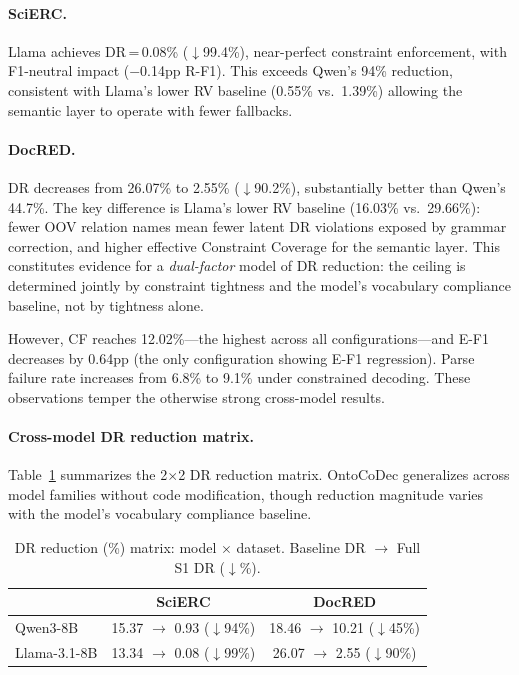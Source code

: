 \documentclass[11pt,a4paper]{article}
\newcommand{\sys}{OntoCoDec\xspace}
\begin{document}
\paragraph{SciERC.}
Llama achieves DR\,=\,0.08\% ($\downarrow$99.4\%), near-perfect constraint enforcement, with F1-neutral impact ($-$0.14pp R-F1).
This exceeds Qwen's 94\% reduction, consistent with Llama's lower RV baseline (0.55\% vs.\ 1.39\%) allowing the semantic layer to operate with fewer fallbacks.

\paragraph{DocRED.}
DR decreases from 26.07\% to 2.55\% ($\downarrow$90.2\%), substantially better than Qwen's 44.7\%.
The key difference is Llama's lower RV baseline (16.03\% vs.\ 29.66\%): fewer OOV relation names mean fewer latent DR violations exposed by grammar correction, and higher effective Constraint Coverage for the semantic layer.
This constitutes evidence for a \emph{dual-factor} model of DR reduction: the ceiling is determined jointly by constraint tightness and the model's vocabulary compliance baseline, not by tightness alone.

However, CF reaches 12.02\%---the highest across all configurations---and E-F1 decreases by 0.64pp (the only configuration showing E-F1 regression).
Parse failure rate increases from 6.8\% to 9.1\% under constrained decoding.
These observations temper the otherwise strong cross-model results.

\paragraph{Cross-model DR reduction matrix.}
Table~\ref{tab:dr_matrix} summarizes the 2$\times$2 DR reduction matrix.
\sys generalizes across model families without code modification, though reduction magnitude varies with the model's vocabulary compliance baseline.

\begin{table}[t]
\centering
\caption{DR reduction (\%) matrix: model $\times$ dataset. Baseline DR $\to$ Full S1 DR ($\downarrow$\%).}
\label{tab:dr_matrix}
\small
\begin{tabular}{lcc}
\toprule
 & \textbf{SciERC} & \textbf{DocRED} \\
\midrule
Qwen3-8B     & 15.37 $\to$ 0.93 ($\downarrow$94\%) & 18.46 $\to$ 10.21 ($\downarrow$45\%) \\
Llama-3.1-8B & 13.34 $\to$ 0.08 ($\downarrow$99\%) & 26.07 $\to$ 2.55 ($\downarrow$90\%) \\
\bottomrule
\end{tabular}
\end{table}
\end{document}
